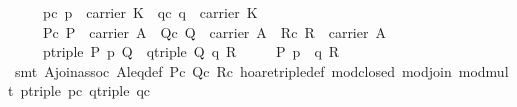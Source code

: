 \begin{isabellebody}
\ \ \ \ \ pc{}\ {}p\ {}\ carrier\ K{}\ \ qc{}\ {}q\ {}\ carrier\ K{}\isanewline
\ \ \ \ \ Pc{}\ {}P\ {}\ carrier\ A{}\ \ Qc{}\ {}Q\ {}\ carrier\ A{}\ \ Rc{}\ {}R\ {}\ carrier\ A{}\isanewline
\ \ \ \ \ p{}triple{}\ {}P\ {}p{}\ Q{}\ \ q{}triple{}\ {}Q\ {}q{}\ R{}\isanewline
\ \ \ \ \ {}P\ {}p\ {}\ q{}\ R{}\isanewline
%
\isadelimproof
\ \ \ \ %
\endisadelimproof
%
\isatagproof
{}\isamarkupfalse%
\ {}smt\ A{}join{}assoc\ A{}leq{}def\ Pc\ Qc\ Rc\ hoare{}triple{}def\ mod{}closed\ mod{}join\ mod{}mult\ p{}triple\ pc\ q{}triple\ qc{}%
\endisatagproof
{\isafoldproof}%
%
\isadelimproof
\isanewline
%
\endisadelimproof

\end{isabellebody}
